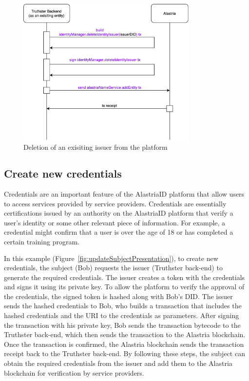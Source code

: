 \documentclass[target=mst,aauheader=]{thud}
\begin{document}
\begin{figure}
    \centering
    \includegraphics[width=0.8\textwidth]{images/deleteExistingIssuer.png}
    \caption{Deletion of an exisiting issuer from the platform}
    \label{fig:deleteIssuer}
\end{figure}

\subsection{Create new credentials}

Credentials are an important feature of the AlastriaID platform that allow users to access services provided by service providers. Credentials are essentially certifications issued by an authority on the AlastriaID platform that verify a user's identity or some other relevant piece of information. For example, a credential might confirm that a user is over the age of 18 or has completed a certain training program.\par
In this example (Figure~\ref{fig:updateSubjectPresentation}), to create new credentials, the subject (Bob) requests the issuer (Truthster back-end) to generate the required credentials. The issuer creates a token with the credentials and signs it using its private key. To allow the platform to verify the approval of the credentials, the signed token is hashed along with Bob's DID. The issuer sends the hashed credentials to Bob, who builds a transaction that includes the hashed credentials and the URI to the credentials as parameters. After signing the transaction with his private key, Bob sends the transaction bytecode to the Truthster back-end, which then sends the transaction to the Alastria blockchain. Once the transaction is confirmed, the Alastria blockchain sends the transaction receipt back to the Truthster back-end. By following these steps, the subject can obtain the required credentials from the issuer and add them to the Alastria blockchain for verification by service providers.
\end{document}
